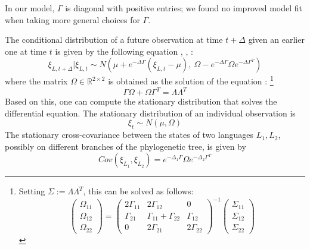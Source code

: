 \documentclass[11pt,a4paper]{article}
\begin{document}
In our model, $\Gamma$ is diagonal with positive entries; we found no improved model fit when taking more general choices for $\Gamma$.

The conditional distribution of a future observation at time $t+\Delta$ given an earlier one at time $t$ is given by the following equation \citep[Theorem 3.3]{schach1971weak}, \citep{gardiner1983handbook}, \citep[p. 156, eq. 6.124]{risken1989fokker}:
\begin{equation}
\xi_{L,t+\Delta} | \xi_{L,t} \sim N\left(\mu + e^{-\Delta \Gamma} (\xi_{L,t}-\mu),\ \Omega - e^{-\Delta \Gamma} \Omega e^{-\Delta \Gamma^T}\right)
\end{equation}
where the matrix $\Omega \in \mathbb{R}^{2\times 2}$ is obtained as the solution of the equation \citep[p. 110, eq. 4.4.51]{gardiner1983handbook} \citep[p. 156, eq. 6.126]{risken1989fokker}:
\footnote{Setting $\Sigma := \Lambda\Lambda^T$, this can be solved as follows:
\begin{equation}
\left(\begin{matrix} \Omega_{11} \\ \Omega_{12} \\ \Omega_{22} \end{matrix}\right)=    \left(\begin{matrix}
    2\Gamma_{11} & 2\Gamma_{12} & 0 \\
    \Gamma_{21} & \Gamma_{11}+\Gamma_{22} & \Gamma_{12} \\
    0 & 2\Gamma_{21} & 2\Gamma_{22}
    \end{matrix}\right)^{-1}  \left(\begin{matrix} \Sigma_{11} \\ \Sigma_{12} \\ \Sigma_{22} \end{matrix}\right)
\end{equation}
}
\begin{equation}
    \Gamma\Omega+\Omega\Gamma^T = \Lambda \Lambda^T
\end{equation}
Based on this, one can compute the stationary distribution that solves the differential equation.
The stationary distribution of an individual observation is
\begin{equation}\label{eq:ornuhl-var}
\xi_{t} \sim N\left(\mu, \Omega \right)
\end{equation}
The stationary cross-covariance between the states of two languages $L_1, L_2$, possibly on different branches of the phylogenetic tree, is given by
\begin{equation}\label{eq:ornuhl-covar}
Cov(\xi_{L_1}, \xi_{L_2}) = e^{-\Delta_1 \Gamma} \Omega e^{-\Delta_2 \Gamma^T}
\end{equation}
\end{document}
